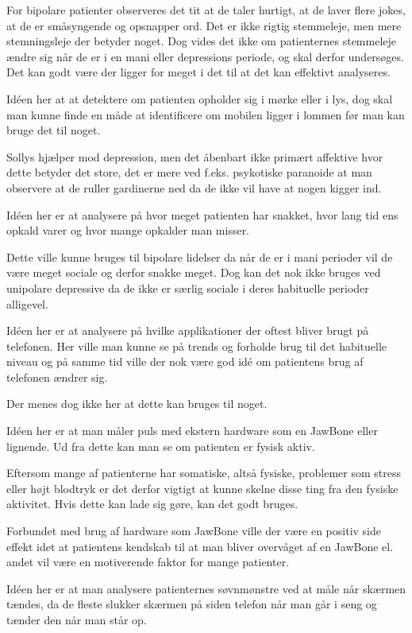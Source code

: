\begin{description}[style=nextline]
	For bipolare patienter observeres det tit at de taler hurtigt, at de laver flere jokes, at de er småsyngende og opsnapper ord. Det er ikke rigtig stemmeleje, men mere stemningsleje der betyder noget. 
	Dog vides det ikke om patienternes stemmeleje ændre sig når de er i en mani eller depressions periode, og skal derfor undersøges.
	Det kan godt være der ligger for meget i det til at det kan effektivt analyseres. 
\item[Lys]
	Idéen her at at detektere om patienten opholder sig i mørke eller i lys, dog skal man kunne finde en måde at identificere om mobilen ligger i lommen før man kan bruge det til noget.
	
	Sollys hjælper mod depression, men det åbenbart ikke primært affektive hvor dette betyder det store, det er mere ved f.eks. psykotiske paranoide at man observere at de ruller gardinerne ned da de ikke vil have at nogen kigger ind. 
\item[Opkaldsoversigt]
	Idéen her er at analysere på hvor meget patienten har snakket, hvor lang tid ens opkald varer og hvor mange opkalder man misser.
	
	Dette ville kunne bruges til bipolare lidelser da når de er i mani perioder vil de være meget sociale og derfor snakke meget. 
	Dog kan det nok ikke bruges ved unipolare depressive da de ikke er særlig sociale i deres habituelle perioder alligevel.
\item[Applikation brug]
	Idéen her er at analysere på hvilke applikationer der oftest bliver brugt på telefonen. Her ville man kunne se på trends og forholde brug til det habituelle niveau og på samme tid ville der nok være god idé om patientens brug af telefonen ændrer sig.
	
	Der menes dog ikke her at dette kan bruges til noget.
\item[Puls]
	Idéen her er at man måler puls med ekstern hardware som en JawBone eller lignende. Ud fra dette kan man se om patienten er fysisk aktiv.
	
	Eftersom mange af patienterne har somatiske, altså fysiske, problemer som stress eller højt blodtryk er det derfor vigtigt at kunne skelne disse ting fra den fysiske aktivitet.
	Hvis dette kan lade sig gøre, kan det godt bruges. 
	
	Forbundet med brug af hardware som JawBone ville der være en positiv side effekt idet at patientens kendskab til at man bliver overvåget af en JawBone el. andet vil være en motiverende faktor for mange patienter. 
\item[Søvnmønstre]
	Idéen her er at man analysere patienternes søvnmønstre ved at måle når skærmen tændes, da de fleste slukker skærmen på siden telefon når man går i seng og tænder den når man står op. 
	

\end{description}
